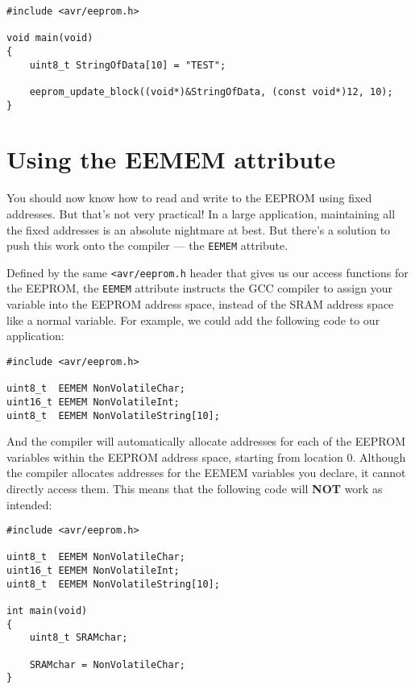 \documentclass[a4paper,oneside,notitlepage]{book}
\begin{document}
\begin{center}
\begin{lstlisting}
#include <avr/eeprom.h>

void main(void)
{
    uint8_t StringOfData[10] = "TEST";

    eeprom_update_block((void*)&StringOfData, (const void*)12, 10);
}
\end{lstlisting}
\end{center}


\chapter{Using the EEMEM attribute}

You should now know how to read and write to the EEPROM using fixed addresses. But that's not very practical! In a large application, maintaining all the fixed addresses is an absolute nightmare at best. But there's a solution to push this work onto the compiler --- the \lstinline{EEMEM} attribute.

Defined by the same \lstinline{<avr/eeprom.h} header that gives us our access functions for the EEPROM, the \lstinline{EEMEM} attribute instructs the GCC compiler to assign your variable into the EEPROM address space, instead of the SRAM address space like a normal variable. For example, we could add the following code to our application:

\begin{center}
\begin{lstlisting}
#include <avr/eeprom.h>

uint8_t  EEMEM NonVolatileChar;
uint16_t EEMEM NonVolatileInt;
uint8_t  EEMEM NonVolatileString[10];
\end{lstlisting}
\end{center}

And the compiler will automatically allocate addresses for each of the EEPROM variables within the EEPROM address space, starting from location 0. Although the compiler allocates addresses for the EEMEM variables you declare, it cannot directly access them. This means that the following code will \textbf{NOT} work as intended:

\begin{center}
\begin{lstlisting}
#include <avr/eeprom.h>

uint8_t  EEMEM NonVolatileChar;
uint16_t EEMEM NonVolatileInt;
uint8_t  EEMEM NonVolatileString[10];

int main(void)
{
    uint8_t SRAMchar;

    SRAMchar = NonVolatileChar;
}
\end{lstlisting}
\end{center}
\end{document}
